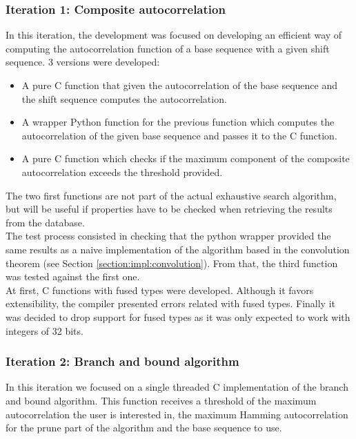       \subsubsection{Iteration 1: Composite autocorrelation}

      In this iteration, the development was focused on developing an efficient
      way of computing the autocorrelation function of a base sequence with a
      given shift sequence. 3 versions were developed:
      \begin{itemize}
        \item A pure C function that given the autocorrelation of the base
        sequence and the shift sequence computes the autocorrelation.
        \item A wrapper Python function for the previous function which
        computes the autocorrelation of the given base sequence and passes it
        to the C function.
        \item A pure C function which checks if the maximum component of the
        composite autocorrelation exceeds the threshold provided.
      \end{itemize}

      The two first functions are not  part of the actual exhaustive search
      algorithm, but will be useful if properties have to be checked when
      retrieving the results from the database. \\

      The test process consisted in checking that the python wrapper provided
      the same results as a naive implementation of the algorithm based in
      the convolution theorem (see Section \ref{section:impl:convolution}). From
      that, the third function was tested against the first one.\\

      At first, C functions with fused types were developed. Although it
      favors extensibility, the compiler presented errors related with
      fused types. Finally  it was decided to drop support for fused types
      as it was only expected to work with integers of 32 bits.\\

      \subsubsection{Iteration 2: Branch and bound algorithm}

      In this iteration we focused on a single threaded C implementation of the
      branch and bound algorithm. This function receives a threshold of the
      maximum autocorrelation the user is interested in, the maximum Hamming
      autocorrelation for the prune part of the algorithm and the base sequence
      to use.\\

